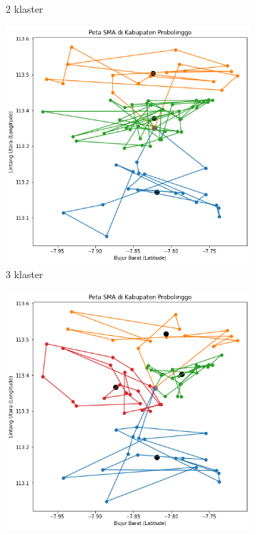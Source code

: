 \begin{figure}[H]
\begin{subfigure}[b]{0.3\textwidth}
		\caption{2 klaster}	
	\end{subfigure}
	\hfill
	\begin{subfigure}[b]{0.3\textwidth}
		\includegraphics[width=\textwidth]{Gambar/Klaster/3.png}
		\caption{3 klaster}	
	\end{subfigure}
	\hfill
	\begin{subfigure}[b]{0.3\textwidth}
		\includegraphics[width=\textwidth]{Gambar/Klaster/4.png}

\end{subfigure}
\end{figure}
